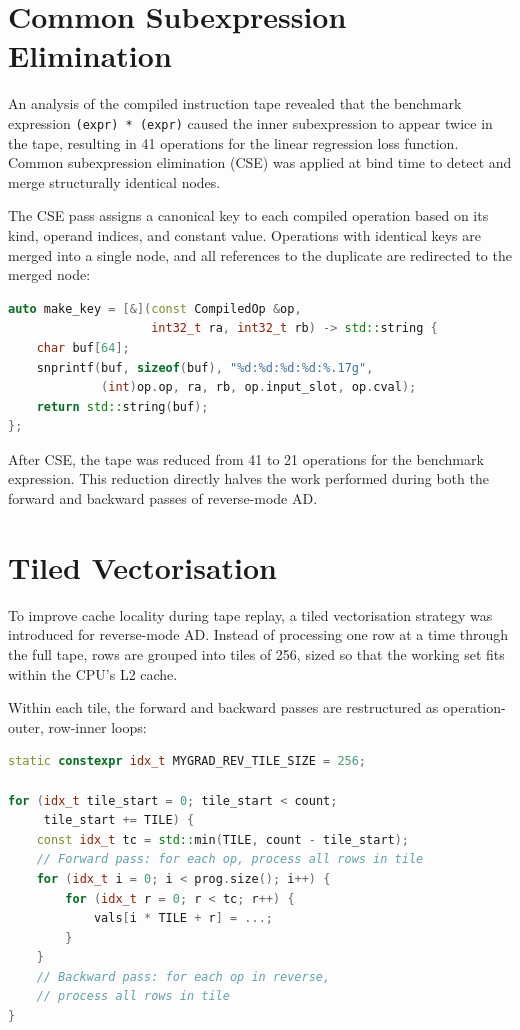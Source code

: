 \documentclass[12pt]{report}
\begin{document}
\section{Common Subexpression Elimination}

An analysis of the compiled instruction tape revealed that the benchmark
expression \texttt{(expr) * (expr)} caused the inner subexpression to appear
twice in the tape, resulting in 41 operations for the linear regression loss
function. Common subexpression elimination (CSE) was applied at bind time to
detect and merge structurally identical nodes.

The CSE pass assigns a canonical key to each compiled operation based on its
kind, operand indices, and constant value. Operations with identical keys are
merged into a single node, and all references to the duplicate are redirected
to the merged node:

\begin{lstlisting}[language=C++]
auto make_key = [&](const CompiledOp &op,
                    int32_t ra, int32_t rb) -> std::string {
    char buf[64];
    snprintf(buf, sizeof(buf), "%d:%d:%d:%d:%.17g",
             (int)op.op, ra, rb, op.input_slot, op.cval);
    return std::string(buf);
};
\end{lstlisting}

After CSE, the tape was reduced from 41 to 21 operations for the benchmark
expression. This reduction directly halves the work performed during both
the forward and backward passes of reverse-mode AD.

\section{Tiled Vectorisation}

To improve cache locality during tape replay, a tiled vectorisation strategy
was introduced for reverse-mode AD. Instead of processing one row at a time
through the full tape, rows are grouped into tiles of 256, sized so that the
working set fits within the CPU's L2 cache.

Within each tile, the forward and backward passes are restructured as
operation-outer, row-inner loops:

\begin{lstlisting}[language=C++]
static constexpr idx_t MYGRAD_REV_TILE_SIZE = 256;

for (idx_t tile_start = 0; tile_start < count;
     tile_start += TILE) {
    const idx_t tc = std::min(TILE, count - tile_start);
    // Forward pass: for each op, process all rows in tile
    for (idx_t i = 0; i < prog.size(); i++) {
        for (idx_t r = 0; r < tc; r++) {
            vals[i * TILE + r] = ...;
        }
    }
    // Backward pass: for each op in reverse,
    // process all rows in tile
}
\end{lstlisting}
\end{document}
